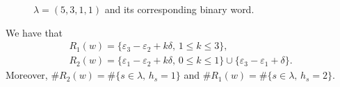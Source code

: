 \documentclass[10pt,a4paper]{amsart}
\numberwithin{equation}{section}
\begin{document}
\begin{Example}
\begin{figure}[th]
\caption{$\lambda=(5,3,1,1)$ and its corresponding binary word.}\label{fig:word111}
\end{figure}

We have that
\begin{gather*}
R_1(w)=\lbrace \varepsilon_3-\varepsilon_2+k\delta,\, 1\leq k\leq 3\rbrace,\\
R_2(w)=\lbrace \varepsilon_1-\varepsilon_2+k\delta,\, 0\leq k\leq 1\rbrace\cup \lbrace \varepsilon_3-\varepsilon_1+\delta\rbrace.
\end{gather*}
Moreover, $\#R_2(w)=\#\lbrace s\in\lambda,\, h_s=1\rbrace$ and $\#R_1(w)=\#\lbrace s\in\lambda,\, h_s=2\rbrace$.
\end{Example}
\end{document}
